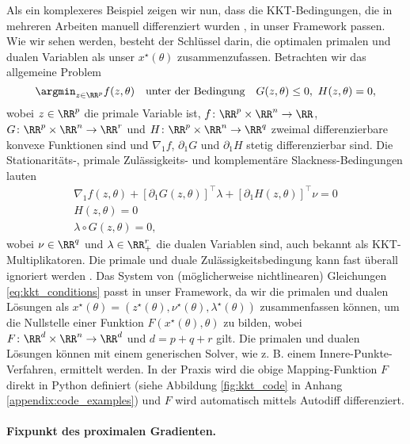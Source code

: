 Als ein komplexeres Beispiel zeigen wir nun, dass die KKT-Bedingungen, die in mehreren Arbeiten manuell differenziert wurden \cite{chapelle_2002,gould_2016,amos_2017,sparsemap,lp_sparsemap}, in unser Framework passen. Wie wir sehen werden, besteht der Schlüssel darin, die optimalen primalen und dualen Variablen als unser $x^\star(\theta)$ zusammenzufassen. Betrachten wir das allgemeine Problem
\begin{equation}
\argmin_{z \in \RR^p} f(z, \theta)
\quad \text{unter der Bedingung} \quad
G(z, \theta) \le 0,
~ H(z, \theta) = 0,
\label{eq:generic_constrained_pb}
\end{equation}
wobei $z \in \RR^p$ die primale Variable ist,
$f \colon \RR^p \times \RR^n \to \RR$,
$G \colon \RR^p \times \RR^n \to \RR^r$
und $H \colon \RR^p \times \RR^n \to \RR^q$
zweimal differenzierbare konvexe Funktionen sind und $\nabla_1 f$, $\partial_1 G$ und $\partial_1 H$ stetig differenzierbar sind. Die Stationaritäts-, primale Zulässigkeits- und komplementäre Slackness-Bedingungen lauten
\begin{align}
\nabla_1 f(z, \theta) + [\partial_1 G(z, \theta)]^\top \lambda + 
[\partial_1 H(z, \theta)]^\top \nu = 0 \\
H(z, \theta) = 0 \\
\lambda \circ G(z, \theta) = 0,
\label{eq:kkt_conditions}
\end{align}
wobei $\nu \in \RR^q$ und $\lambda \in \RR^r_+$ die dualen Variablen sind, auch bekannt als KKT-Multiplikatoren.
Die primale und duale Zulässigkeitsbedingung kann fast überall ignoriert werden \cite{tutorial_implicit}.
Das System von (möglicherweise nichtlinearen) Gleichungen \eqref{eq:kkt_conditions} passt in unser Framework, da wir die primalen und dualen Lösungen als $x^\star(\theta) = (z^\star(\theta), \nu^\star(\theta), \lambda^\star(\theta))$ zusammenfassen können, um die Nullstelle einer Funktion $F(x^\star(\theta), \theta)$ zu bilden, wobei $F \colon \RR^d \times \RR^n \to \RR^d$ und $d = p + q + r$ gilt. Die primalen und dualen Lösungen können mit einem generischen Solver, wie z. B. einem Innere-Punkte-Verfahren, ermittelt werden.
In der Praxis wird die obige Mapping-Funktion $F$ direkt in Python definiert (siehe Abbildung \ref{fig:kkt_code} in Anhang \ref{appendix:code_examples}) und $F$ wird automatisch mittels Autodiff differenziert.

\paragraph{Fixpunkt des proximalen Gradienten.}

